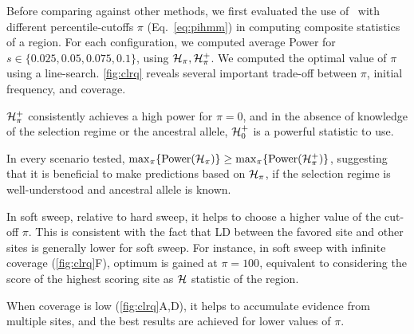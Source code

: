 Before comparing against other methods, we first evaluated the use of
\comale\ with different percentile-cutoffs $\pi$ (Eq.~\ref{eq:pihmm})
in computing composite statistics of a region. For each configuration,
we computed average Power for $s\in\{0.025,0.05,0.075,0.1\}$, using
${\cal H}_\pi,{\cal H}^{+}_\pi$. We computed the optimal value of $\pi$ using a
line-search. \ref{fig:clrq} reveals several important trade-off
between $\pi$, initial frequency, and coverage.
\begin{packed_itemize}
\item ${\cal H}^{+}_\pi$ consistently achieves a high power for $\pi=0$,
  and in the absence of knowledge of the selection regime or the
  ancestral allele, ${\cal H}^{+}_0$ is a powerful statistic to use.
\item In every scenario tested,
  $\max_{\pi}\{\mbox{Power}({\cal H}_\pi)\}\ge
  \max_{\pi}\{\mbox{Power}({\cal H}^{+}_\pi)\}$, suggesting that it is beneficial to 
  make predictions based on ${\cal H}_{\pi}$, if the
  selection regime is well-understood and ancestral allele is known.
\item In soft sweep, relative to hard sweep, it helps to choose a
  higher value of the cut-off $\pi$. This is consistent with the fact that LD
  between the favored site and other sites is generally lower for
  soft sweep. For instance, in soft sweep with infinite coverage
  (\ref{fig:clrq}F), optimum is gained at $\pi=100$, equivalent
  to considering the score of the highest scoring site as ${\cal H}$ statistic of 
  the region.
\item When coverage is low (\ref{fig:clrq}A,D), it helps to
  accumulate evidence from multiple sites, and the best results are
  achieved for lower values of $\pi$.
\end{packed_itemize}

